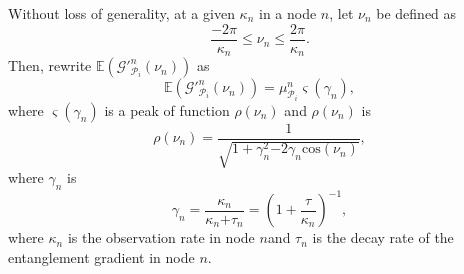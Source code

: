 \documentclass[11pt]{article}%
\begin{document}
Without loss of generality, at a given ${\kappa }_n$ in a node $n$, let ${\nu }_n$ be defined as  
\begin{equation} \label{46)} 
\frac{\mathrm{-}\mathrm{2}\pi }{{\kappa }_n}\mathrm{\le }{\nu }_n\mathrm{\le }\frac{\mathrm{2}\pi }{{\kappa }_n}.                                                                             
\end{equation} 
Then, rewrite $\mathbb{E}\left({\mathcal{G}}'^n_{{\mathcal{P}}_i}\left({\nu }_n\right)\right)$ as
\begin{equation} \label{47)} 
\mathbb{E}\left({\mathcal{G}}'^n_{{\mathcal{P}}_i}\left({\nu }_n\right)\right)\mathrm{=}{\mu }^n_{{\mathcal{P}}_i}\varsigma \left({\gamma }_n\right),                                                                      
\end{equation} 
where $\varsigma \left({\gamma }_n\right)$ is a peak of function $\rho \left({\nu }_n\right)$ and $\rho \left({\nu }_n\right)$ is
\begin{equation} \label{ZEqnNum511294} 
\rho \left({\nu }_n\right)\mathrm{=}\frac{\mathrm{1}}{\sqrt{\mathrm{1+}{\gamma }^{\mathrm{2}}_n\mathrm{-}\mathrm{2}{\gamma }_n\mathrm{cos}\left({\nu }_n\right)}},                                                                 
\end{equation} 
where ${\gamma }_n$ is
\begin{equation} \label{49)} 
{\gamma }_n\mathrm{=}\frac{{\kappa }_n}{{\kappa }_n\mathrm{+}{\tau }_n}\mathrm{=}{\left(\mathrm{1+}\frac{\tau }{{\kappa }_n}\right)}^{\mathrm{-}\mathrm{1}},                                                                   
\end{equation} 
where ${\kappa }_n$ is the observation rate in node $n$and ${\tau }_n$ is the decay rate of the entanglement gradient in node $n$.
\end{document}
